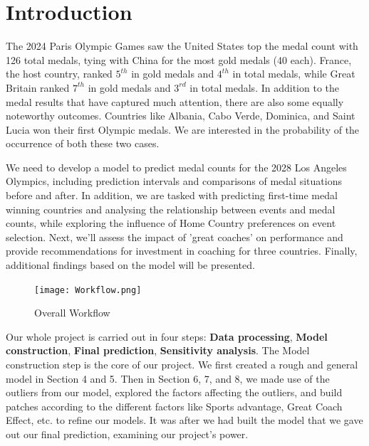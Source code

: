 \documentclass{mcmthesis}
\renewcommand{\contentsname}{\hspace*{\fill}\Large\bfseries Contents \hspace*{\fill}}
\begin{document}
\tableofcontents
\thispagestyle{empty}

\newpage

\section{Introduction}


The 2024 Paris Olympic Games saw the United States top the medal count with 126 total medals, tying with China for the most gold medals (40 each). France, the host country, ranked $5^{th}$ in gold medals and $4^{th}$ in total medals, while Great Britain ranked $7^{th}$ in gold medals and $3^{rd}$ in total medals. In addition to the medal results that have captured much attention, there are also some equally noteworthy outcomes. Countries like Albania, Cabo Verde, Dominica, and Saint Lucia won their first Olympic medals. We are interested in the probability of the occurrence of both these two cases.

We need to develop a model to predict medal counts for the 2028 Los Angeles Olympics, including prediction intervals and comparisons of medal situations before and after. In addition, we are tasked with predicting first-time medal winning countries and analysing the relationship between events and medal counts, while exploring the influence of Home Country preferences on event selection. Next, we'll assess the impact of 'great coaches' on performance and provide recommendations for investment in coaching for three countries. Finally, additional findings based on the model will be presented.

\begin{figure}
    \centering
    \texttt{[image: Workflow.png]}
    \caption{Overall Workflow}
    \label{fig:enter-label}
\end{figure}

Our whole project is carried out in four steps: \textbf{Data processing}, \textbf{Model construction}, \textbf{Final prediction}, \textbf{Sensitivity analysis}. The Model construction step is the core of our project. We first created a rough and general model in Section 4 and 5. Then in Section 6, 7, and 8, we made use of the outliers from our model, explored the factors affecting the outliers, and build patches according to the different factors like Sports advantage, Great Coach Effect, etc. to refine our models. It was after we had built the model that we gave out our final prediction, examining our project's power.
\end{document}
